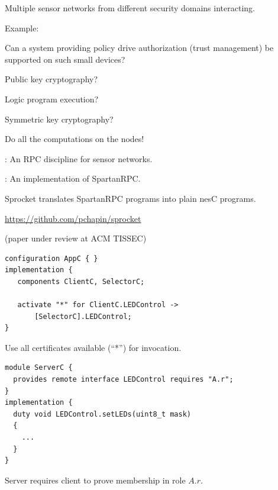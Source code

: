 
Multiple sensor networks from different security domains interacting.

Example: 

Can a system providing policy drive authorization (trust management) be supported on such small
devices?
\begin{citemize}
\item Public key cryptography?
\item Logic program execution?
\item Symmetric key cryptography?
\end{citemize}
\stopslide




\begin{citemize}
\item Do all the computations on the nodes!
\item {}: An RPC discipline for sensor networks.
\item {}: An implementation of SpartanRPC.
\end{citemize}

Sprocket translates SpartanRPC programs into plain nesC programs.

\begin{center}
\url{https://github.com/pchapin/sprocket}
\end{center}

(paper under review at ACM TISSEC)
\stopslide

\begin{lstlisting}[language=nesC]
configuration AppC { }
implementation {
   components ClientC, SelectorC;

   activate "*" for ClientC.LEDControl ->
       [SelectorC].LEDControl;
}
\end{lstlisting}

Use all certificates available (``*'') for invocation.
\stopslide

\begin{lstlisting}[language=nesC]
module ServerC {
  provides remote interface LEDControl requires "A.r";
}
implementation {
  duty void LEDControl.setLEDs(uint8_t mask)
  {
    ...
  }
}
\end{lstlisting}

Server requires client to prove membership in role $A.r$.
\stopslide

